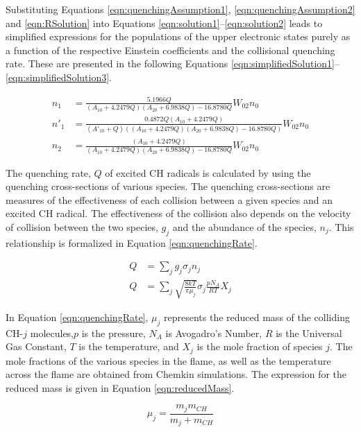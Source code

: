 Substituting Equations \ref{eqn:quenchingAssumption1}, \ref{eqn:quenchingAssumption2} and \ref{eqn:RSolution} into Equations \ref{eqn:solution1}--\ref{eqn:solution2} leads to simplified expressions for the populations of the upper electronic states purely as a function of the respective Einstein coefficients and the collisional quenching rate.
These are presented in the following Equations \ref{eqn:simplifiedSolution1}--\ref{eqn:simplifiedSolution3}.

\begin{align}
  n_1 &= \frac{ 5.1966Q }{ ( A_{10} + 4.2479Q )( A_{20} + 6.9838Q ) - 16.8780Q } W_{02}n_0
  \label{eqn:simplifiedSolution1}\\
  n'_1 &= \frac{ 0.4872Q( A_{10} + 4.2479Q ) }{ ( A'_{10} + Q ) \left( ( A_{10} + 4.2479Q )( A_{20} + 6.9838Q ) - 16.8780Q \right) } W_{02}n_0
  \label{eqn:simplifiedSolution2}\\
  n_2 &= \frac{ ( A_{10} + 4.2479Q ) }{ ( A_{10} + 4.2479Q )( A_{20} + 6.9838Q ) - 16.8780Q } W_{02}n_0
  \label{eqn:simplifiedSolution3}
\end{align}

The quenching rate, \(Q\) of excited CH radicals is calculated by using the quenching cross-sections of various species.
The quenching cross-sections are measures of the effectiveness of each collision between a given species and an excited CH radical.
The effectiveness of the collision also depends on the velocity of collision between the two species, \(g_j\) and the abundance of the species, \(n_j\).
This relationship is formalized in Equation \ref{eqn:quenchingRate}.

\begin{align}
  Q & =\sum_j g_j \sigma_j n_j \nonumber \\
  Q & = \sum_j \sqrt{\frac{ 8kT }{ \pi\mu_j }} \sigma_j \frac{ pN_A }{ RT } X_j
  \label{eqn:quenchingRate}
\end{align}

In Equation \ref{eqn:quenchingRate}, \(\mu_j\) represents the reduced mass of the colliding CH-\(j\) molecules,\(p\) is the pressure, \(N_A\) is Avogadro's Number, \(R\) is the Universal Gas Constant, \(T\) is the temperature, and \(X_j\) is the mole fraction of species \(j\).
The mole fractions of the various species in the flame, as well as the temperature across the flame are obtained from Chemkin simulations.
The expression for the reduced mass is given in Equation \ref{eqn:reducedMass}.

\begin{equation}
  \mu_j = \frac{ m_j m_{CH} }{ m_j + m_{CH} }
  \label{eqn:reducedMass}
\end{equation}

